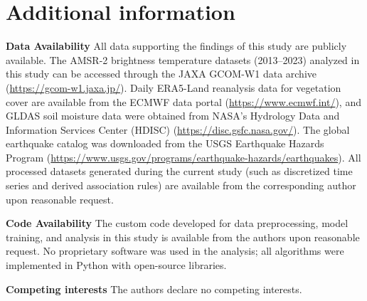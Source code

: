 \documentclass[fleqn,10pt]{wlscirep_mdpi_style}
\begin{document}
\section*{Additional information}
\textbf{Data Availability} 
All data supporting the findings of this study are publicly available. The AMSR-2 brightness temperature datasets (2013–2023) analyzed in this study can be accessed through the JAXA GCOM-W1 data archive (\url{https://gcom-w1.jaxa.jp/}). Daily ERA5-Land reanalysis data for vegetation cover are available from the ECMWF data portal (\url{https://www.ecmwf.int/}), and GLDAS soil moisture data were obtained from NASA's Hydrology Data and Information Services Center (HDISC) (\url{https://disc.gsfc.nasa.gov/}). The global earthquake catalog was downloaded from the USGS Earthquake Hazards Program (\url{https://www.usgs.gov/programs/earthquake-hazards/earthquakes}). All processed datasets generated during the current study (such as discretized time series and derived association rules) are available from the corresponding author upon reasonable request.

\textbf{Code Availability} 
The custom code developed for data preprocessing, model training, and analysis in this study is available from the authors upon reasonable request. No proprietary software was used in the analysis; all algorithms were implemented in Python with open-source libraries.

\textbf{Competing interests} The authors declare no competing interests.

%  
\end{document}
